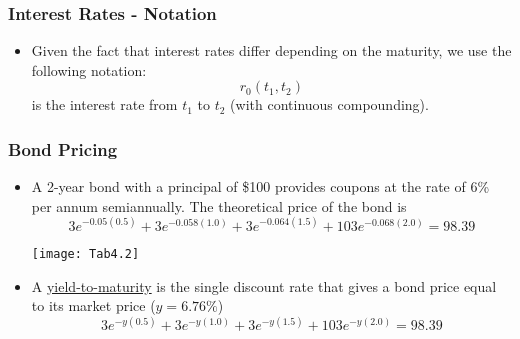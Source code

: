 \documentclass[10pt]{beamer}
\begin{document}
\begin{frame}
	\frametitle{Interest Rates - Notation}
	\begin{itemize}
		\item Given the fact that interest rates differ depending on the maturity, we use the following notation:
		$$
			r_0(t_1,t_2)
		$$
		is the interest rate from $t_1$ to $t_2$ (with continuous compounding).\\ \vspace{10pt}
	\end{itemize}
	
\begin{center}	
\end{center}
\end{frame}


\begin{frame}
	\frametitle{Bond Pricing}
	\begin{itemize}\itemsep10pt
		\item A 2-year bond with a principal of \$100 provides coupons at the rate of 6\% per annum semiannually. The theoretical price of the bond is
		$$
		3e^{-0.05(0.5)} + 3e^{-0.058(1.0)} + 3e^{-0.064(1.5)} + 103e^{-0.068(2.0)} = 98.39
		$$
		\begin{center}
			\texttt{[image: Tab4.2]} 
		\end{center}
		\item A \underline{yield-to-maturity} is the single discount rate that gives a bond price equal to its market price ($y=6.76\%$)
		$$
		3e^{-y(0.5)} + 3e^{-y(1.0)} + 3e^{-y(1.5)} + 103e^{-y(2.0)} = 98.39
		$$
	\end{itemize}
\end{frame}
\end{document}
